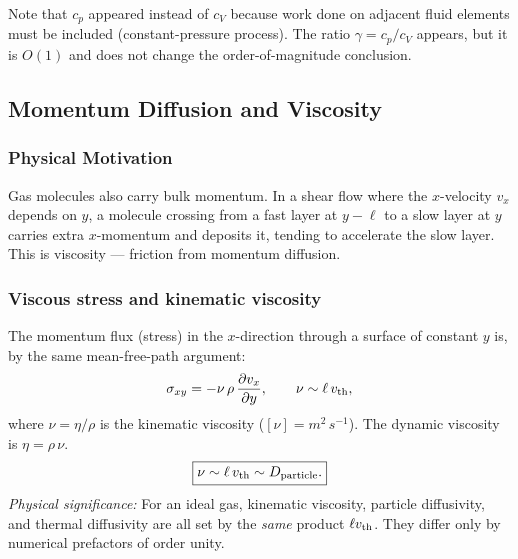 Note that $c_p$ appeared instead of $c_V$ because work done on adjacent fluid
elements must be included (constant-pressure process). The ratio $\gamma =
c_p/c_V$ appears, but it is $O(1)$ and does not change the order-of-magnitude
conclusion.

\subsection{Momentum Diffusion and Viscosity}
\label{sec:lec06:viscosity}

\subsubsection*{Physical Motivation}
Gas molecules also carry bulk momentum. In a shear flow where the $x$-velocity
$v_x$ depends on $y$, a molecule crossing from a fast layer at $y-\ell$ to a
slow layer at $y$ carries extra $x$-momentum and deposits it, tending to
accelerate the slow layer. This is viscosity — friction from momentum diffusion.

\subsubsection*{Viscous stress and kinematic viscosity}
The momentum flux (stress) in the $x$-direction through a surface of constant
$y$ is, by the same mean-free-path argument:
\begin{equation}
    \sigma_{xy}
    = -\nu\,\rho\,\frac{\partial v_x}{\partial y},
    \qquad
    \nu \sim \ell\,v_{\rm th},
    \label{eq:lec06:viscous-stress}
\end{equation}
where $\nu = \eta/\rho$ is the kinematic viscosity ($[\nu] = \si{m^2\,s^{-1}}$).
The dynamic viscosity is $\eta = \rho\,\nu$.
\begin{equation}
    \boxed{
    \nu \sim \ell\,v_{\rm th} \sim D_{\rm particle} .
    }
    \label{eq:lec06:nu-estimate}
\end{equation}
\textit{Physical significance:} For an ideal gas, kinematic viscosity,
particle diffusivity, and thermal diffusivity are all set by the \emph{same}
product $\ell v_{\rm th}$. They differ only by numerical prefactors of
order unity.

